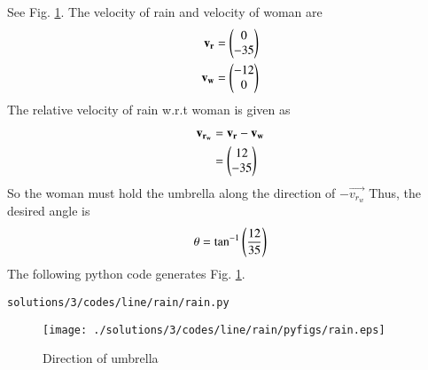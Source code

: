 See Fig. \ref{fig:3.8.3_rain}.
The velocity of rain and velocity of woman are
\begin{align}
\mathbf{v_r} &= \begin{pmatrix}0\\-35\end{pmatrix}
\\
\mathbf{v_w} &= \begin{pmatrix}-12\\0\end{pmatrix}
\end{align}
The relative velocity of rain w.r.t woman is given as
\begin{align}
\mathbf{v_{r_w}} &=\mathbf{v_r}- \mathbf{v_w}
\\
&=\begin{pmatrix}12\\-35\end{pmatrix}
\end{align}
So the woman must hold the umbrella along the direction of $-\vec{v_{r_w}}$
Thus, the desired angle is 
\begin{align}
\theta={\tan}^{-1}\left(\frac{12}{35}\right)
\end{align}
The following python code generates Fig. \ref{fig:3.8.3_rain}. 
%
\begin{lstlisting}
solutions/3/codes/line/rain/rain.py
\end{lstlisting}
\begin{figure}[!ht]
\centering
\texttt{[image: ./solutions/3/codes/line/rain/pyfigs/rain.eps]}
\caption{Direction of umbrella}
\label{fig:3.8.3_rain}
\end{figure}
